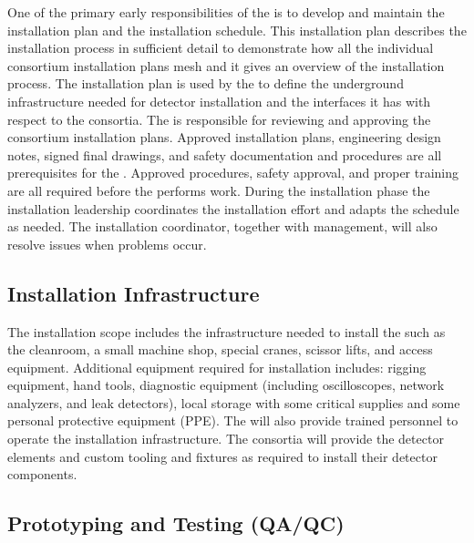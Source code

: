 One of the primary early responsibilities of the  is to
develop and maintain the  installation plan and the
installation schedule. This installation plan 
describes the installation process in sufficient detail to demonstrate
how all the individual consortium installation plans mesh and it 
gives an overview of the installation process. The installation plan
is used by the  to define the underground infrastructure
needed for detector installation and the interfaces it has with respect  to 
the consortia. The  is responsible for reviewing and
approving the consortium installation plans. Approved installation
plans, engineering design notes, signed final drawings, and safety
documentation and procedures are all prerequisites for the . 
Approved procedures, safety approval, and
proper training are all required before the  performs
work. During the installation phase the installation leadership 
coordinates the  installation effort and adapts the schedule
as needed. The installation coordinator, together with management, will also
resolve issues when problems occur.







\subsection{Installation Infrastructure}

The installation scope includes the infrastructure needed to install
the  such as the cleanroom, a small machine shop, special
cranes, scissor lifts, and access equipment.  Additional equipment
required for installation includes: rigging equipment, hand tools,
diagnostic equipment (including oscilloscopes, network analyzers, and
leak detectors), local storage with some critical supplies and some
personal protective equipment (PPE). The  will also provide
trained personnel to operate the installation infrastructure. The
consortia will provide the detector elements and custom tooling and
fixtures as required to install their detector components.





\subsection{Prototyping and Testing (QA/QC)}
\label{sec:fdsp-tc-inst-qaqc}

